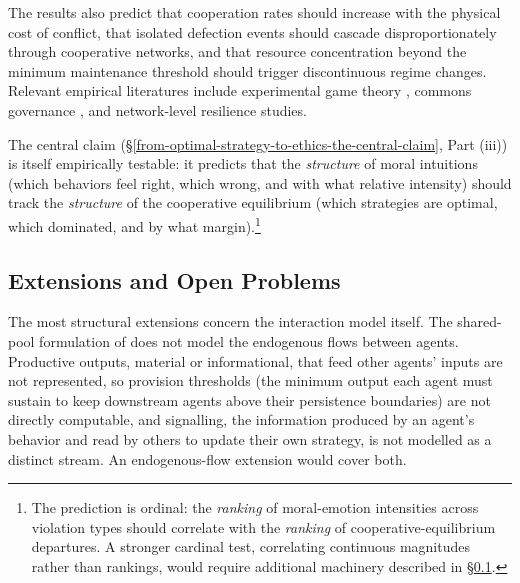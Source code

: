 \documentclass[11pt]{article}
\theoremstyle{plain}
\theoremstyle{definition}
\theoremstyle{remark}
\let\origsubsection\subsection
\renewcommand{\subsection}{\needspace{7\baselineskip}\origsubsection}
\begin{document}
\normalsize

The results also predict that cooperation rates should increase with the
physical cost of conflict, that isolated defection events should cascade
disproportionately through cooperative networks, and that resource
concentration beyond the minimum maintenance threshold should trigger
discontinuous regime changes. Relevant empirical literatures include
experimental game theory \citep{Axelrod1984}, commons governance
\citep{Ostrom1990}, and network-level resilience studies.

The central claim
(§\ref{from-optimal-strategy-to-ethics-the-central-claim}, Part (iii))
is itself empirically testable: it predicts that the \emph{structure} of
moral intuitions (which behaviors feel right, which wrong, and with what
relative intensity) should track the \emph{structure} of the cooperative
equilibrium (which strategies are optimal, which dominated, and by what
margin).\footnote{The prediction is ordinal: the \emph{ranking} of
  moral-emotion intensities across violation types should correlate with
  the \emph{ranking} of cooperative-equilibrium departures. A stronger
  cardinal test, correlating continuous magnitudes rather than rankings,
  would require additional machinery described in
  §\ref{extensions-and-open-problems}.}

\subsection{Extensions and Open
Problems}\label{extensions-and-open-problems}

The most structural extensions concern the interaction model itself. The
shared-pool formulation of \citep{TC-I} does not model the endogenous
flows between agents. Productive outputs, material or informational,
that feed other agents' inputs are not represented, so provision
thresholds (the minimum output each agent must sustain to keep
downstream agents above their persistence boundaries) are not directly
computable, and signalling, the information produced by an agent's
behavior and read by others to update their own strategy, is not
modelled as a distinct stream. An endogenous-flow extension would cover
both.
\end{document}
